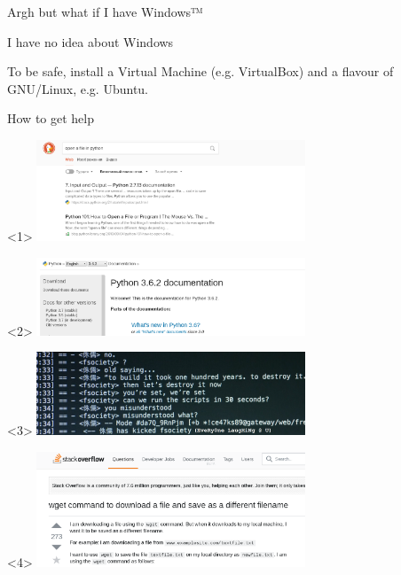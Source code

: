 \documentclass[10pt, compress]{beamer}
\begin{document}
\begin{frame}{Argh but what if I have Windows™}

\begin{center}
I have no idea about Windows
\end{center}

To be safe, install a Virtual Machine (e.g. VirtualBox) and a flavour
of GNU/Linux, e.g. Ubuntu.

\end{frame}

\begin{frame}{How to get help}

\begin{center}
  \begin{onlyenv}<1>
  \includegraphics[width=0.6\textwidth]{graphics/duckduckopenfile.png}
  \end{onlyenv}
  \begin{onlyenv}<2>
  \includegraphics[width=0.6\textwidth]{graphics/pythondocs.png}
  \end{onlyenv}
  \begin{onlyenv}<3>
  \includegraphics[width=0.6\textwidth]{graphics/CKmO8DXVAAAWl1d.png}
  \end{onlyenv}
  \begin{onlyenv}<4>
  \includegraphics[width=0.6\textwidth]{graphics/stackoverflow.png}
  \end{onlyenv}
\end{center}


\end{frame}
\end{document}
